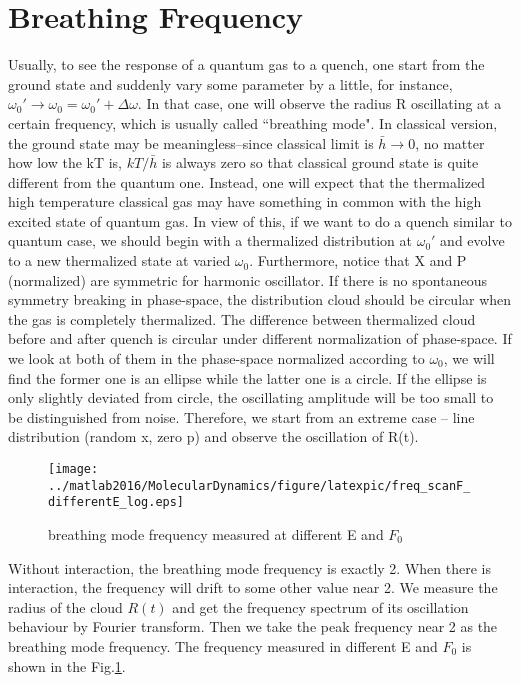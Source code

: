\documentclass[a4paper,onecolumn,12pt]{article}
\begin{document}
\newpage
\section{Breathing Frequency}
Usually, to see the response of a quantum gas to a quench, one start from the ground state and suddenly vary some parameter by a little, for instance, $\omega_0'\rightarrow\omega_0=\omega_0'+\Delta\omega$. In that case, one will observe the radius R oscillating at a certain frequency, which is usually called ``breathing mode".
In classical version, the ground state may be meaningless--since classical limit is $\bar{h}\rightarrow 0$, no matter how low the kT is, $kT/\bar{h}$ is always zero so that classical ground state is quite different from the quantum one. Instead, one will expect that the thermalized high temperature classical gas may have something in common with the high excited state of quantum gas. In view of this, if we want to do a quench similar to quantum case, we should begin with a thermalized distribution at $\omega_0'$ and evolve to a new thermalized state at varied $\omega_0$. Furthermore, notice that X and P (normalized) are symmetric for harmonic oscillator. If there is no spontaneous symmetry breaking in phase-space, the distribution cloud should be circular when the gas is completely thermalized. The difference between thermalized cloud before and after quench is  circular under different normalization of phase-space. If we look at both of them in the phase-space normalized according to $\omega_0$, we will find the former one is an ellipse while the latter one is a circle.
If the ellipse is only slightly deviated from circle, the oscillating amplitude will be too small to be distinguished from noise. Therefore, we start from an extreme case -- line distribution (random x, zero p) and observe the oscillation of R(t).
\begin{figure}[hbtp]
\center
\texttt{[image: ../matlab2016/MolecularDynamics/figure/latexpic/freq\_scanF\_differentE\_log.eps]}
\caption{breathing mode frequency measured at different E and $F_0$}
\label{Breathingfrequency1}
\end{figure}

Without interaction, the breathing mode frequency is exactly 2. When there is interaction, the frequency will drift to some other value near 2. We measure the radius of the cloud $R(t)$ and get the frequency spectrum of its oscillation behaviour by Fourier transform. Then we take the peak frequency near 2 as the breathing mode frequency. The frequency measured in different E and $F_0$ is shown in the Fig.\ref{Breathingfrequency1}.
\end{document}
